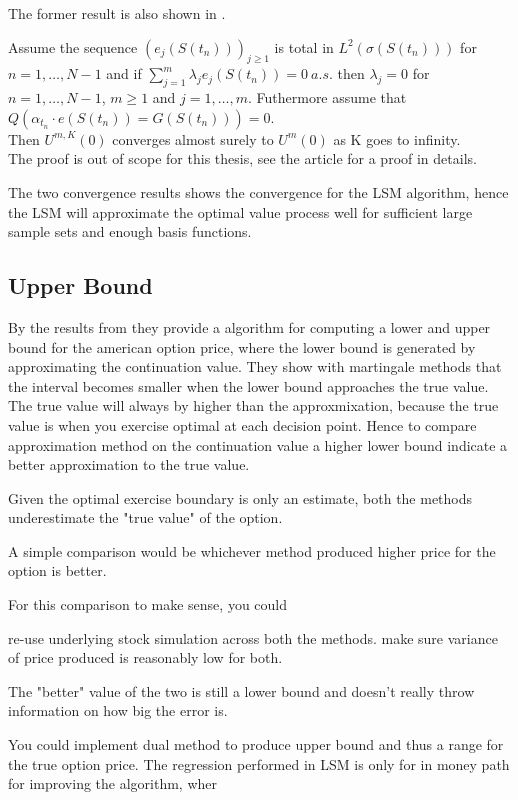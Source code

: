 The former result is also shown in \parencite{analysislsm}.
\begin{theorem}\label{LSMConvergence2}
Assume the sequence $(e_{j}(S(t_n)))_{j\geq 1}$ is total in $L^2(\sigma(S(t_n)))$ for $n=1,\ldots,N-1$ and if $\sum_{j=1}^{m} \lambda_j e_{j}(S(t_n))=0 \ a.s.$ then $\lambda_j=0$ for $n=1,\ldots,N-1$, $m\geq 1$ and $j=1,\ldots,m$. Futhermore assume that $Q(\alpha_{t_n} \cdot e(S(t_n))=G(S(t_n)))=0$.\\
Then $U^{m,K}(0)$ converges almost surely to $U^{m}(0)$ as K goes to infinity.\\
The proof is out of scope for this thesis, see the article \parencite{analysislsm} for a proof in details. 
\end{theorem}

The two convergence results shows the convergence for the LSM algorithm, hence the LSM will approximate the optimal value process well for sufficient large sample sets and enough basis functions.


\subsection{Upper Bound}
By the results from \parencite{AndersenLeif2004} they provide a algorithm for computing a lower and upper bound for the american option price, where the lower bound is generated by approximating the continuation value. They show with martingale methods that the interval becomes smaller when the lower bound approaches the true value. The true value will always by higher than the approxmixation, because the true value is when you exercise optimal at each decision point. Hence to compare approximation method on the continuation value a higher lower bound indicate a better approximation to the true value.

Given the optimal exercise boundary is only an estimate, both the methods underestimate the "true value" of the option.

A simple comparison would be whichever method produced higher price for the option is better.

For this comparison to make sense, you could

    re-use underlying stock simulation across both the methods.
    make sure variance of price produced is reasonably low for both.

The "better" value of the two is still a lower bound and doesn't really throw information on how big the error is.

You could implement dual method to produce upper bound and thus a range for the true option price.
The regression performed in LSM is only for in money path for improving the algorithm, wher



